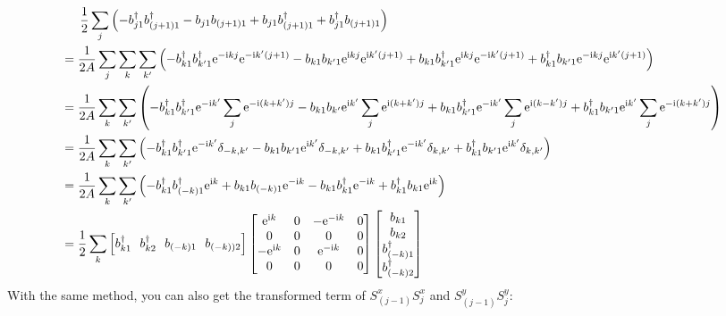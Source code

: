 \documentclass[letter]{article}
\newcommand{\e}{\mathrm{e}}
\newcommand{\ii}{\mathrm{i}}
\begin{document}
  $$
\begin{aligned}
  & \indent  \frac{1}{2}\sum_{j}\left(-b_{j1}^{\dagger}b_{(j+1)1}^{\dagger}-b_{j1}b_{(j+1)1}+b_{j1}b_{(j+1)1}^{\dagger}+b_{j1}^{\dagger}b_{(j+1)1}\right)\\
  &=\frac{1}{2A}\sum_{j}\sum_{k}\sum_{k'}\left(-b_{k1}^{\dagger}b_{k'1}^{\dagger}\e^{-\ii kj}\e^{-\ii k'(j+1)}-b_{k1}b_{k'1}\e^{\ii kj}\e^{\ii k'(j+1)}+b_{k1}b_{k'1}^{\dagger}\e^{\ii kj}\e^{-\ii k'(j+1)}+b_{k1}^{\dagger}b_{k'1}\e^{-\ii kj}\e^{\ii k'(j+1)}\right)\\
  &=\frac{1}{2A}\sum_{k}\sum_{k'}\left(-b_{k1}^{\dagger}b_{k'1}^{\dagger}\e^{-\ii k'}\sum_j \e^{-\ii (k+k')j}-b_{k1}b_{k'}\e^{\ii k'}\sum_j \e^{\ii (k+k')j}+b_{k1}b_{k'1}^{\dagger}\e^{-\ii k'}\sum_j \e^{\ii (k-k')j}+b_{k1}^{\dagger}b_{k'1}\e^{\ii k'}\sum_j \e^{-\ii (k+k')j}\right)\\
  &=\frac{1}{2A}\sum_k\sum_{k'}\left(-b_{k1}^{\dagger}b_{k'1}^{\dagger}\e^{-\ii k'}\delta_{-k,k'}-b_{k1}b_{k'1}\e^{\ii k'}\delta_{-k,k'}+b_{k1}b_{k'1}^{\dagger}\e^{-\ii k'}\delta_{k,k'}+b_{k1}^{\dagger}b_{k'1}\e^{\ii k'}\delta_{k,k'}\right)\\
  &=\frac{1}{2A}\sum_k\sum_{k'}\left(-b_{k1}^{\dagger}b_{(-k)1}^{\dagger}\e^{\ii k}+b_{k1}b_{(-k)1}\e^{-\ii k}-b_{k1}b_{k1}^{\dagger}\e^{-\ii k}+b_{k1}^{\dagger}b_{k1}\e^{\ii k}\right)\\
  &=\frac{1}{2}\sum_k \left[
    b_{k1}^{\dagger} \ \ 
    b_{k2}^{\dagger}\  \ 
    b_{(-k)1}\ \ 
    b_{(-k))2}\right]
   \begin{bmatrix}
        \e^{\ii k} & 0 & -\e^{-\ii k} & 0 \\
       0 &  0 & 0 &0 \\
       -\e^{\ii k} &  0 & \e^{-\ii k} &0\\
        0 & 0 & 0& 0
        \end{bmatrix}\begin{bmatrix}
            b_{k1}  \\
            b_{k2}  \\
            b_{(-k)1}^{\dagger}\\
            b_{(-k)2}^{\dagger}
            \end{bmatrix}
\end{aligned}
$$
With the same method, you can also get the transformed term of $S_{(j-1)}^x S_j^x$ and $S_{(j-1)}^y S_j^y$:
\end{document}
